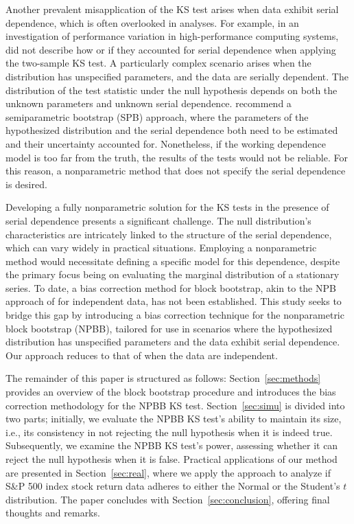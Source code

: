 \documentclass[12pt]{article}
\begin{document}
Another prevalent misapplication of the KS test arises when data exhibit serial
dependence, which is often overlooked in analyses. For example, in an
investigation of performance variation in high-performance computing systems,
\citet{tuncer2019ieee} did not describe how or if they accounted for serial
dependence when applying the two-sample KS test.
A particularly complex scenario arises when the distribution has unspecified
parameters, and the data are serially dependent.
The distribution of the test statistic under the null hypothesis depends on both
the unknown parameters and unknown serial dependence.
\citet{zeimbekakis2022misuses} recommend a semiparametric bootstrap (SPB)
approach, where the parameters of the hypothesized distribution and the serial
dependence both need to be estimated and their uncertainty accounted for.
Nonetheless, if the working dependence model is too far from the truth, the
results of the tests would not be reliable. For this reason, a nonparametric
method that does not specify the serial dependence is desired.


Developing a fully nonparametric solution for the KS
tests in the presence of serial dependence presents a significant
challenge. The null distribution's characteristics are intricately linked to
the structure of the serial dependence, which can vary widely in practical
situations. Employing a nonparametric method would necessitate defining a
specific model for this dependence, despite the primary focus being on
evaluating the marginal distribution of a stationary series. To date, a bias
correction method for block bootstrap, akin to the NPB
approach of \citet{babu2004goodness} for independent data,
has not been established. This study seeks
to bridge this gap by introducing a bias correction technique for the
nonparametric block bootstrap (NPBB), tailored for use in scenarios where the
hypothesized distribution has unspecified parameters and the data
exhibit serial dependence. Our approach reduces to that of
\citet{babu2004goodness} when the data are independent.


The remainder of this paper is structured as follows:
Section~\ref{sec:methods} provides an overview of the block bootstrap
procedure and introduces the bias correction methodology for the
NPBB KS test. Section~\ref{sec:simu} is divided
into two parts; initially, we evaluate the NPBB KS test's ability to maintain
its size, i.e., its consistency in not rejecting the null hypothesis when
it is indeed true. Subsequently, we examine the NPBB KS test's power, assessing
whether it can reject the null hypothesis when it is false. Practical
applications of our method are presented in Section~\ref{sec:real}, where
we apply the approach to analyze if S\&P 500 index stock return
data adheres to either the Normal or the Student's $t$ distribution. The
paper concludes with Section~\ref{sec:conclusion}, offering final thoughts
and remarks.
\end{document}
